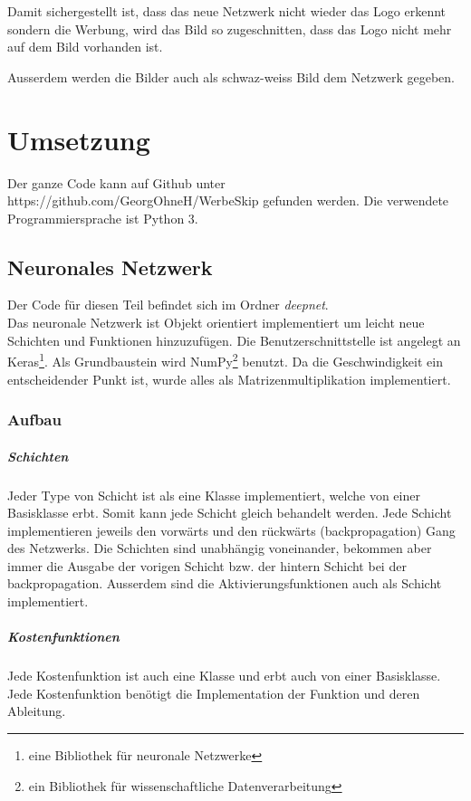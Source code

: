 \documentclass[12pt,a4paper]{report}
\begin{document}
Damit sichergestellt ist, dass das neue Netzwerk nicht wieder das Logo erkennt sondern die Werbung,
wird das Bild so zugeschnitten, dass das Logo nicht mehr auf dem Bild vorhanden ist.

Ausserdem werden die Bilder auch als schwaz-weiss Bild dem Netzwerk gegeben.


\chapter{Umsetzung}
\label{ch:umsetzung}
Der ganze Code kann auf Github unter https://github.com/GeorgOhneH/WerbeSkip gefunden werden.
Die verwendete Programmiersprache ist Python 3\cite{python}.
\section{Neuronales Netzwerk}
Der Code für diesen Teil befindet sich im Ordner \textit{deepnet}.\bigskip\\
Das neuronale Netzwerk ist Objekt orientiert implementiert um leicht neue Schichten und Funktionen hinzuzufügen.
Die Benutzerschnittstelle ist angelegt an Keras\footnote{eine Bibliothek für neuronale Netzwerke}.
Als Grundbaustein wird NumPy\cite{numpy}\footnote{ein Bibliothek für wissenschaftliche Datenverarbeitung} benutzt.
Da die Geschwindigkeit ein entscheidender Punkt ist, wurde alles als Matrizenmultiplikation implementiert.

\subsection{Aufbau}
\paragraph{Schichten}
Jeder Type von Schicht ist als eine Klasse implementiert, welche von einer Basisklasse erbt.
Somit kann jede Schicht gleich behandelt werden.
Jede Schicht implementieren jeweils den vorwärts und den rückwärts (backpropagation) Gang des Netzwerks.
Die Schichten sind unabhängig voneinander, bekommen aber immer die Ausgabe der vorigen Schicht bzw. der hintern Schicht bei der backpropagation.
Ausserdem sind die Aktivierungsfunktionen auch als Schicht implementiert.
\paragraph{Kostenfunktionen}
Jede Kostenfunktion ist auch eine Klasse und erbt auch von einer Basisklasse.
Jede Kostenfunktion benötigt die Implementation der Funktion und deren Ableitung.
\end{document}
